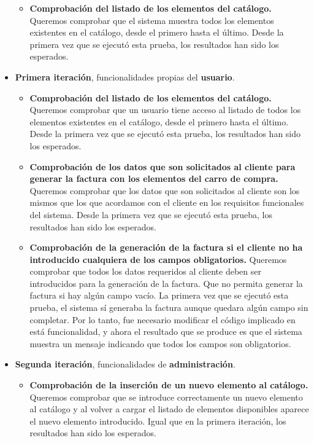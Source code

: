 \begin{itemize}
\begin{itemize}
	\item \textbf{Comprobación del listado de los elementos del catálogo.} Queremos comprobar que el sistema muestra todos los elementos existentes en el catálogo, desde el primero hasta el último. Desde la primera vez que se ejecutó esta prueba, los resultados han sido los esperados.
	\end{itemize}
	
\item \vspace{0.1in} \textbf{Primera iteración}, funcionalidades propias del \textbf{usuario}.
	\begin{itemize}
	\item \textbf{Comprobación del listado de los elementos del catálogo.} Queremos comprobar que un usuario tiene acceso al listado de todos los elementos existentes en el catálogo, desde el primero hasta el último. Desde la primera vez que se ejecutó esta prueba, los resultados han sido los esperados.
	
	\item \textbf{Comprobación de los datos que son solicitados al cliente para generar la factura con los elementos del carro de compra.} Queremos comprobar que los datos que son solicitados al cliente son los mismos que los que acordamos con el cliente en los requisitos funcionales del sistema. Desde la primera vez que se ejecutó esta prueba, los resultados han sido los esperados.

	\item \textbf{Comprobación de la generación de la factura si el cliente no ha introducido cualquiera de los campos obligatorios.} Queremos comprobar que todos los datos requeridos al cliente deben ser introducidos para la generación de la factura. Que no permita generar la factura si hay algún campo vacío. La primera vez que se ejecutó esta prueba, el sistema sí generaba la factura aunque quedara algún campo sin completar. Por lo tanto, fue necesario modificar el código implicado en está funcionalidad, y ahora el resultado que se produce es que el sistema muestra un mensaje indicando que todos los campos son obligatorios.
	\end{itemize}		
	
\item \vspace{0.1in} \textbf{Segunda iteración}, funcionalidades de \textbf{administración}.
	\begin{itemize}
	\item \textbf{Comprobación de la inserción de un nuevo elemento al catálogo.} Queremos comprobar que se introduce 				correctamente un nuevo elemento al catálogo y al volver a cargar el listado de elementos disponibles aparece el nuevo elemento introducido. Igual que en la primera iteración, los resultados han sido los esperados.


\end{itemize}
\end{itemize}
